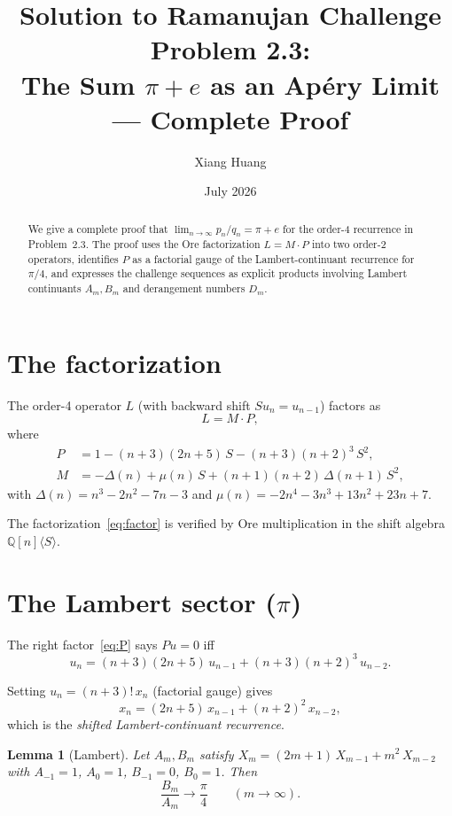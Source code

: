 \documentclass[11pt]{article}
\title{Solution to Ramanujan Challenge Problem 2.3:\\
The Sum $\pi + e$ as an Ap\'ery Limit --- Complete Proof}
\author{Xiang Huang}
\date{July 2026}
\newtheorem{lemma}[theorem]{Lemma}
\begin{document}
\maketitle

\begin{abstract}
We give a complete proof that $\lim_{n\to\infty} p_n/q_n = \pi + e$
for the order-4 recurrence in Problem~2.3.  The proof uses the
Ore factorization $L = M \cdot P$ into two order-2 operators,
identifies $P$ as a factorial gauge of the Lambert-continuant
recurrence for $\pi/4$, and expresses the challenge sequences as
explicit products involving Lambert continuants $A_m, B_m$ and
derangement numbers $D_m$.
\end{abstract}

\section{The factorization}

The order-4 operator $L$ (with backward shift $Su_n = u_{n-1}$)
factors as
\begin{equation}\label{eq:factor}
L = M \cdot P,
\end{equation}
where
\begin{align}
P &= 1 - (n+3)(2n+5)\,S - (n+3)(n+2)^3\,S^2, \label{eq:P}\\
M &= -\Delta(n) + \mu(n)\,S + (n+1)(n+2)\,\Delta(n+1)\,S^2,
  \label{eq:M}
\end{align}
with $\Delta(n) = n^3 - 2n^2 - 7n - 3$ and
$\mu(n) = -2n^4 - 3n^3 + 13n^2 + 23n + 7$.

The factorization~\eqref{eq:factor} is verified by Ore
multiplication in the shift algebra $\mathbb{Q}[n]\langle S \rangle$.

\section{The Lambert sector ($\pi$)}

The right factor~\eqref{eq:P} says $Pu = 0$ iff
\[
u_n = (n+3)(2n+5)\,u_{n-1} + (n+3)(n+2)^3\,u_{n-2}.
\]

Setting $u_n = (n+3)!\,x_n$ (factorial gauge) gives
\begin{equation}\label{eq:Lambert}
x_n = (2n+5)\,x_{n-1} + (n+2)^2\,x_{n-2},
\end{equation}
which is the \emph{shifted Lambert-continuant recurrence}.

\begin{lemma}[Lambert]
Let $A_m, B_m$ satisfy
$X_m = (2m+1)\,X_{m-1} + m^2\,X_{m-2}$
with $A_{-1} = 1$, $A_0 = 1$, $B_{-1} = 0$, $B_0 = 1$.
Then
\[
\frac{B_m}{A_m} \longrightarrow \frac{\pi}{4}
\qquad (m \to \infty).
\]
\end{lemma}
\end{document}
